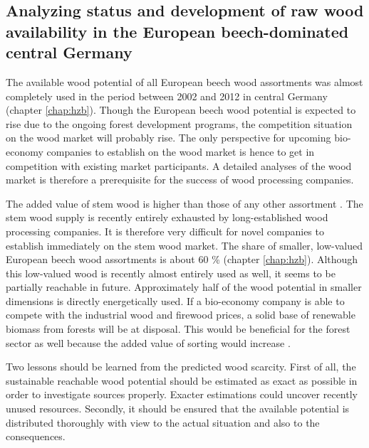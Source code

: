 \subsection{Analyzing status and development of raw wood availability in the European beech-dominated central Germany}
\label{subsec:discussion:struct:hzb}
The available wood potential of all European beech wood assortments was almost completely used in the period between 2002 and 2012 in central Germany (chapter \ref{chap:hzb}). Though the European beech wood potential is expected to rise due to the ongoing forest development programs, the competition situation on the wood market will probably rise. The only perspective for upcoming bio-economy companies to establish on the wood market is hence to get in competition with existing market participants. A detailed analyses of the wood market is therefore a prerequisite for the success of wood processing companies. 

The added value of stem wood is higher than those of any other assortment \citep{nagel_2008}. The stem wood supply is recently entirely exhausted by long-established wood processing companies. It is therefore very difficult for novel companies to establish immediately on the stem wood market. The share of smaller, low-valued European beech wood assortments is about 60 \% (chapter \ref{chap:hzb}). Although this low-valued wood is recently almost entirely used as well, it seems to be partially reachable in future. Approximately half of the wood potential in smaller dimensions is directly energetically used. If a bio-economy company is able to compete with the industrial wood and firewood prices, a solid base of renewable biomass from forests will be at disposal. This would be beneficial for the forest sector as well because the added value of sorting would increase \cite[p. 67]{mohring_1997}.

Two lessons should be learned from the predicted wood scarcity. First of all, the sustainable reachable wood potential should be estimated as exact as possible in order to investigate sources properly. Exacter estimations could uncover recently unused resources. Secondly, it should be ensured that the available potential is distributed thoroughly with view to the actual situation and also to the consequences.

